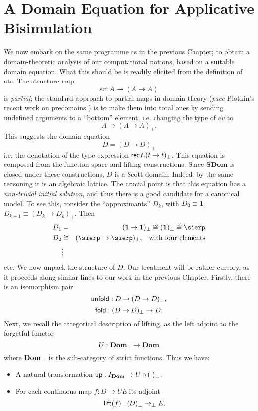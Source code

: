 \section{A Domain Equation for Applicative Bisimulation}
We now embark on the same programme as in the previous Chapter; 
to obtain a domain-theoretic analysis of our computational notions, 
based on a suitable domain equation. 
What this should be is readily elicited from the definition of ats. 
The structure map
\[ ev : A \rightharpoonup (A \rightarrow A) \]
is {\em partial}; the standard approach to partial maps in domain theory 
({\em pace} Plotkin's recent work on predomains \cite{Plo85}) is to make 
them into total ones by sending undefined arguments to a ``bottom'' element, 
i.e. changing the type of $ev$ to
\[ A \rightarrow (A \rightarrow A)_{\bot} . \]
This suggests the domain equation
\[ D = (D \rightarrow D)_{\bot} \]
i.e. the denotation of the type expression 
${\sf rec} \, t. (t \rightarrow t)_{\bot}$. 
This equation is composed from the function space and lifting constructions. 
Since {\bf SDom} is closed under these constructions, $D$ is a Scott domain. 
Indeed, by the same reasoning it is an algebraic lattice. 
The crucial point is that this equation has a 
{\em non-trivial initial solution}, and thus there is a good candidate 
for a canonical model. 
To see this, consider the ``approximants'' $D_{k}$, with 
$D_{0} \equiv {\bf 1}$, $D_{k+1} \equiv (D_{k} \rightarrow D_{k})_{\bot}$. 
Then
\begin{eqnarray*}
D_{1} & = &  ({\bf 1} \rightarrow {\bf 1})_{\bot} \cong ({\bf 1})_{\bot} \cong \sierp \\
D_{2} & \cong & (\sierp \rightarrow \sierp )_{\bot}, \;\;\; \mbox{with four elements} \\
& \vdots & 
\end{eqnarray*} 
etc. 
We now unpack the structure of $D$. Our treatment will be rather cursory, 
as it proceeds along similar lines to our work in the previous Chapter. 
Firstly, there is an isomorphism pair 
\[ {\sf unfold} : D \rightarrow (D \rightarrow D)_{\bot}, \]
\[ {\sf fold} : (D \rightarrow D)_{\bot} \rightarrow D . \]
Next, we recall the categorical description of lifting, as the left adjoint 
to the forgetful functor
\[ U : {\bf Dom}_{\bot} \rightarrow {\bf Dom} \]
where ${\bf Dom}_{\bot}$ is the sub-category of strict functions. 
Thus we have:
\begin{itemize}
\item A natural transformation ${\sf up} : I_{\bf Dom} \rightarrow U \circ 
( \cdot )_{\bot}$.
\item For each continuous map $f : D \rightarrow U E$ its adjoint
\[ {\sf lift}(f) : (D)_{\bot} \rightarrow_{\bot} E . \]
\end{itemize}
